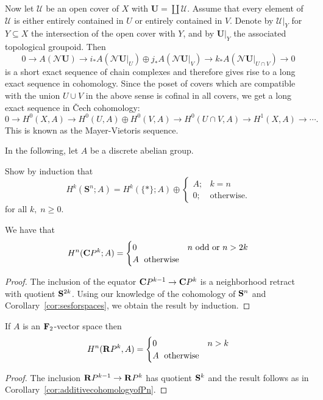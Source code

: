 \documentclass[a4paper,openany]{scrbook}
\newcommand{\nerve}{\mathcal N}
\begin{document}
Now let $\mathcal U$ be an open cover of $X$ with $\mathbf U = \coprod \mathcal U$. Assume that every element of $\mathcal U$ is either entirely contained in $U$ or entirely contained in $V$. Denote by $\mathcal U|_Y$ for $Y \subseteq X$ the intersection of the open cover with $Y$, and by $\mathbf U|_Y$ the associated topological groupoid. Then
\[
0 \to A(\nerve \mathbf U) \to i_*A(\nerve \mathbf U|_U) \oplus j_*A(\nerve \mathbf U|_V) \to k_*A(\nerve \mathbf U|_{U \cap V}) \to 0
\]
is a short exact sequence of chain complexes and therefore gives rise to a long exact sequence in cohomology. Since the poset of covers which are compatible with the union $U \cup V$ in the above sense is cofinal in all covers, we get a long exact sequence in \v Cech cohomology:
\[
0 \to H^0(X,A) \to H^0(U,A) \oplus H^0(V,A) \to H^0(U\cap V,A) \to H^1(X,A) \to \cdots.
\]
This is known as the Mayer-Vietoris sequence.

In the following, let $A$ be a discrete abelian group.
\begin{exer}\label{exer:cohomologyofspheres}
Show by induction that 
\[
H^k(\mathbf S^n;A) = H^k(\{*\};A) \oplus \begin{cases} A;& k=n\\ 0;& \text{otherwise.}\end{cases}
\]
for all $k,\;n \geq 0$.
\end{exer}

\begin{corollary}\label{cor:additivecohomologyofPn}
We have that
\[
H^n(\CP^k;A) = \begin{cases} 0\; & n \text{ odd or } n>2k\\ A\; \text{ otherwise}\end{cases}
\]
\end{corollary}
\begin{proof}
The inclusion of the equator $\CP^{k-1} \to \CP^k$ is a neighborhood retract with quotient $\S^{2k}$. Using our knowledge of the cohomology of $\S^n$ and Corollary~\ref{cor:sesforspaces}, we obtain the result by induction.
\end{proof}

\begin{corollary}\label{cor:additivecohomologyofRPn}
If $A$ is an $\F_2$-vector space then
\[
H^n(\R P^k,A) = \begin{cases} 0\; & n > k\\ A\; \text{ otherwise}\end{cases}
\]
\end{corollary}
\begin{proof}
The inclusion $\R P^{k-1} \to \R P^k$ has quotient $\S^k$ and the result follows as in Corollary~\ref{cor:additivecohomologyofPn}. 
\end{proof}
\end{document}

